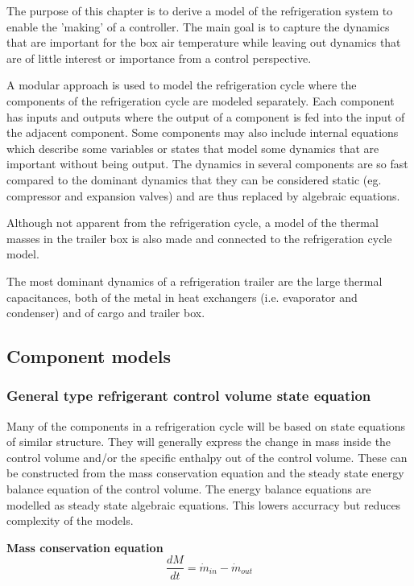 The purpose of this chapter is to derive a model of the refrigeration system to enable the 'making' of a controller. The main goal is to capture the dynamics that are important for the box air temperature while leaving out dynamics that are of little interest or importance from a control perspective.

A modular approach is used to model the refrigeration cycle where the components of the refrigeration cycle are modeled separately. Each component has inputs and outputs where the output of a component is fed into the input of the adjacent component. Some components may also include internal equations which describe some variables or states that model some dynamics that are important without being output. The dynamics in several components are so fast compared to the dominant dynamics that they can be considered static (eg. compressor and expansion valves) and are thus replaced by algebraic equations.

Although not apparent from the refrigeration cycle, a model of the thermal masses in the trailer box is also made and connected to the refrigeration cycle model.

The most dominant dynamics of a refrigeration trailer are the large thermal capacitances, both of the metal in heat exchangers (i.e. evaporator and condenser) and of cargo and trailer box.

\subsection{Component models}

\subsubsection{General type refrigerant control volume state equation}
Many of the components in a refrigeration cycle will be based on state equations of similar structure. They will generally express the change in mass inside the control volume and/or the specific enthalpy out of the control volume. These can be constructed from the mass conservation equation and the steady state energy balance equation of the control volume. The energy balance equations are modelled as steady state algebraic equations. This lowers accurracy but reduces complexity of the models.

\textbf{Mass conservation equation} \\
\begin{equation} \label{eq:GeneralTypeControlVol_MassConservation}
	\frac{dM}{dt} = \dot{m}_{in} - \dot{m}_{out}
\end{equation}

